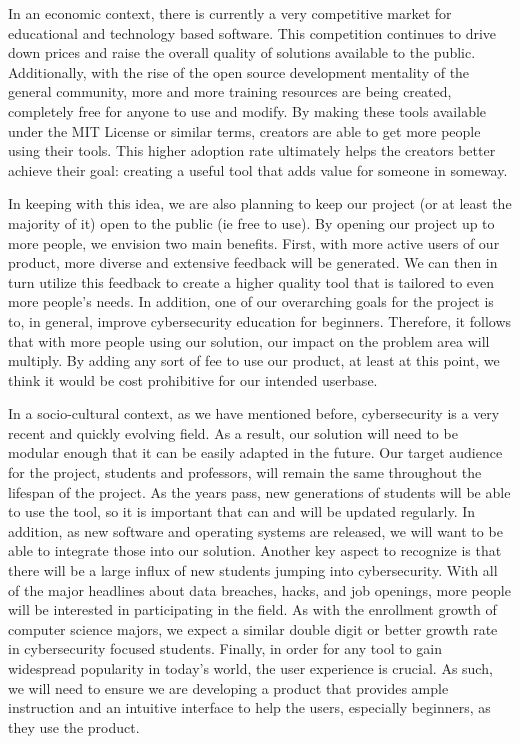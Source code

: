 \documentclass[openright]{report}
\begin{document}
\par In an economic context, there is currently a very competitive market for educational and technology based software. This competition continues to drive down prices and raise the overall quality of solutions available to the public. Additionally, with the rise of the open source development mentality of the general community, more and more training resources are being created, completely free for anyone to use and modify. By making these tools available under the MIT License or similar terms, creators are able to get more people using their tools. This higher adoption rate ultimately helps the creators better achieve their goal: creating a useful tool that adds value for someone in someway.

\par In keeping with this idea, we are also planning to keep our project (or at least the majority of it) open to the public (ie free to use). By opening our project up to more people, we envision two main benefits. First, with more active users of our product, more diverse and extensive feedback will be generated. We can then in turn utilize this feedback to create a higher quality tool that is tailored to even more people's needs. In addition, one of our overarching goals for the project is to, in general, improve cybersecurity education for beginners. Therefore, it follows that with more people using our solution, our impact on the problem area will multiply. By adding any sort of fee to use our product, at least at this point, we think it would be cost prohibitive for our intended userbase.

\par In a socio-cultural context, as we have mentioned before, cybersecurity is a very recent and quickly evolving field. As a result, our solution will need to be modular enough that it can be easily adapted in the future. Our target audience for the project, students and professors, will remain the same throughout the lifespan of the project. As the years pass, new generations of students will be able to use the tool, so it is important that can and will be updated regularly. In addition, as new software and operating systems are released, we will want to be able to integrate those into our solution. Another key aspect to recognize is that there will be a large influx of new students jumping into cybersecurity. With all of the major headlines about data breaches, hacks, and job openings, more people will be interested in participating in the field. As with the enrollment growth of computer science majors, we expect a similar double digit or better growth rate in cybersecurity focused students. Finally, in order for any tool to gain widespread popularity in today's world, the user experience is crucial. As such, we will need to ensure we are developing a product that provides ample instruction and an intuitive interface to help the users, especially beginners, as they use the product.
\end{document}
